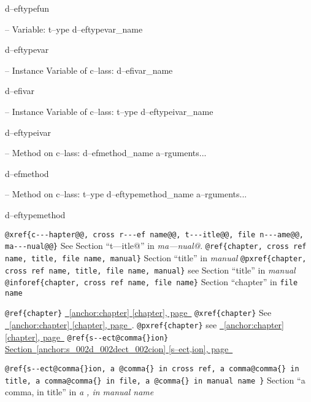 \documentclass{book}
\begin{document}
\begin{titlepage}
%
d--eftypefun

\hbox{}-- Variable: t--ype d--eftypevar\_name


%
d--eftypevar

\hbox{}-- Instance Variable of c--lass: d--efivar\_name


%
d--efivar

\hbox{}-- Instance Variable of c--lass: t--ype d--eftypeivar\_name


%
d--eftypeivar

\hbox{}-- Method on c--lass: d--efmethod\_name a--rguments...


%
d--efmethod

\hbox{}-- Method on c--lass: t--ype d--eftypemethod\_name a--rguments...


%
d--eftypemethod

\texttt{@xref\{c{-}{-}{-}hapter@@, cross r{-}{-}{-}ef name@@, t{-}{-}{-}itle@@, file n{-}{-}{-}ame@@, ma{-}{-}{-}nual@@\}} See Section ``t---itle@'' in \textit{ma---nual@}.
\texttt{@ref\{chapter, cross ref name, title, file name, manual\}} Section ``title'' in \textit{manual}
\texttt{@pxref\{chapter, cross ref name, title, file name, manual\}} see Section ``title'' in \textit{manual}
\texttt{@inforef\{chapter, cross ref name, file name\}} Section ``chapter'' in \texttt{file name}

\texttt{@ref\{chapter\}} \hyperref[anchor:chapter]{\chaptername~\ref*{anchor:chapter} [chapter], page~\pageref*{anchor:chapter}}
\texttt{@xref\{chapter\}} See \hyperref[anchor:chapter]{\chaptername~\ref*{anchor:chapter} [chapter], page~\pageref*{anchor:chapter}}.
\texttt{@pxref\{chapter\}} see \hyperref[anchor:chapter]{\chaptername~\ref*{anchor:chapter} [chapter], page~\pageref*{anchor:chapter}}
\texttt{@ref\{s{-}{-}ect@comma\{\}ion\}} \hyperref[anchor:s_002d_002dect_002cion]{Section~\ref*{anchor:s_002d_002dect_002cion} [s--ect,ion], page~\pageref*{anchor:s_002d_002dect_002cion}}

\texttt{@ref\{s{-}{-}ect@comma\{\}ion, a @comma\{\} in cross
ref, a comma@comma\{\} in title, a comma@comma\{\} in file, a @comma\{\} in manual name \}}
Section ``a comma, in title'' in \textit{a , in manual name}


\end{titlepage}
\end{document}
